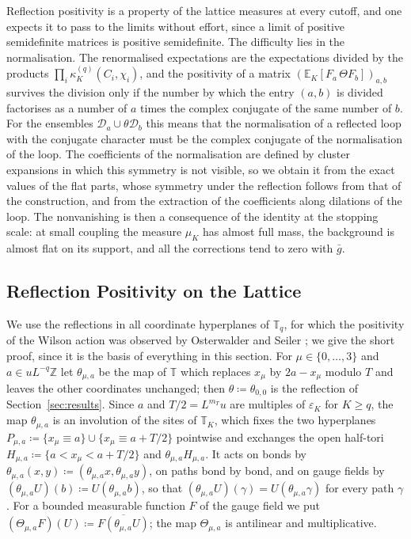 \documentclass[11pt]{preprint}
\numberwithin{equation}{section}
\theoremstyle{definition}
\theoremstyle{remark}
\theoremstyle{plain}
\begin{document}
Reflection positivity is a property of the lattice measures at every cutoff, and one expects it to pass to the limits without effort, since a limit of positive semidefinite matrices is positive semidefinite. The difficulty lies in the normalisation. The renormalised expectations are the expectations divided by the products $\prod_i\kappa^{(q)}_K(C_i, \chi_i)$, and the positivity of a matrix $(\mathbb E_K[F_a\,\Theta F_b])_{a,b}$ survives the division only if the number by which the entry $(a, b)$ is divided factorises as a number of $a$ times the complex conjugate of the same number of $b$. For the ensembles $\mathcal D_a \cup \theta\mathcal D_b$ this means that the normalisation of a reflected loop with the conjugate character must be the complex conjugate of the normalisation of the loop. The coefficients of the normalisation are defined by cluster expansions in which this symmetry is not visible, so we obtain it from the exact values of the flat parts, whose symmetry under the reflection follows from that of the construction, and from the extraction of the coefficients along dilations of the loop. The nonvanishing is then a consequence of the identity at the stopping scale: at small coupling the measure $\mu_K$ has almost full mass, the background is almost flat on its support, and all the corrections tend to zero with $\bar g$.

\subsection{Reflection Positivity on the Lattice}\label{sec:lattice-reflection-positivity}

We use the reflections in all coordinate hyperplanes of $\mathbb T_q$, for which the positivity of the Wilson action was observed by Osterwalder and Seiler \cite{OsterwalderSeiler}; we give the short proof, since it is the basis of everything in this section. For $\mu \in \{ 0, \dots, 3 \}$ and $a \in uL^{-q}\mathbb Z$ let $\theta_{\mu,a}$ be the map of $\mathbb T$ which replaces $x_\mu$ by $2a - x_\mu$ modulo $T$ and leaves the other coordinates unchanged; then $\theta \coloneqq \theta_{0,0}$ is the reflection of Section~\ref{sec:results}. Since $a$ and $T/2 = L^{m_T}u$ are multiples of $\varepsilon_K$ for $K \geq q$, the map $\theta_{\mu,a}$ is an involution of the sites of $\mathbb T_K$, which fixes the two hyperplanes $P_{\mu,a} \coloneqq \{ x_\mu \equiv a \} \cup \{ x_\mu \equiv a + T/2 \}$ pointwise and exchanges the open half-tori $H_{\mu,a} \coloneqq \{ a < x_\mu < a + T/2 \}$ and $\theta_{\mu,a}H_{\mu,a}$. It acts on bonds by $\theta_{\mu,a}(x, y) \coloneqq (\theta_{\mu,a}x, \theta_{\mu,a}y)$, on paths bond by bond, and on gauge fields by $(\theta_{\mu,a}U)(b) \coloneqq U(\theta_{\mu,a}b)$, so that $(\theta_{\mu,a}U)(\gamma) = U(\theta_{\mu,a}\gamma)$ for every path $\gamma$. For a bounded measurable function $F$ of the gauge field we put $(\Theta_{\mu,a}F)(U) \coloneqq \overline{F(\theta_{\mu,a}U)}$; the map $\Theta_{\mu,a}$ is antilinear and multiplicative.
\end{document}
